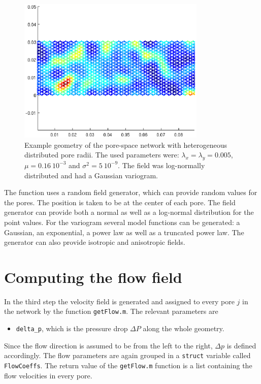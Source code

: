 \documentclass[12pt]{report}
\begin{document}
\begin{figure}[ht]
	\centering
	\includegraphics[width=0.8\textwidth]{MainPoreNetwork_02}
	\caption[]{Example geometry of the pore-space network with heterogeneous distributed pore radii. The used parameters were: $\lambda_x = \lambda_y = 0.005$, $\mu = 0.16\ 10^{-3}$ and $\sigma^2 = 5\ 10^{-9}$. The field was log-normally distributed and had a Gaussian variogram.}
	\label{fig:radii}
\end{figure}

The function uses a random field generator, which can provide random values for the pores. The position is taken to be at the center of each pore. The field generator can provide both a normal as well as a log-normal distribution for the point values. For the variogram several model functions can be generated: a Gaussian, an exponential, a power law as well as a truncated power law. The generator can also provide isotropic and anisotropic fields.

\section{Computing the flow field}

In the third step the velocity field is generated and assigned to every pore $j$ in the network by the function {\tt getFlow.m}. The relevant parameters are

\begin{itemize}
	\item  {\tt delta\_p}, which is the pressure drop $\Delta P$ along the whole geometry.
\end{itemize}

Since the flow direction is assumed to be from the left to the right, $\Delta p$ is defined accordingly. The flow parameters are again grouped in a {\tt struct} variable called {\tt FlowCoeffs}. The return value of the {\tt getFlow.m} function is a list containing the flow velocities in every pore.
\end{document}

